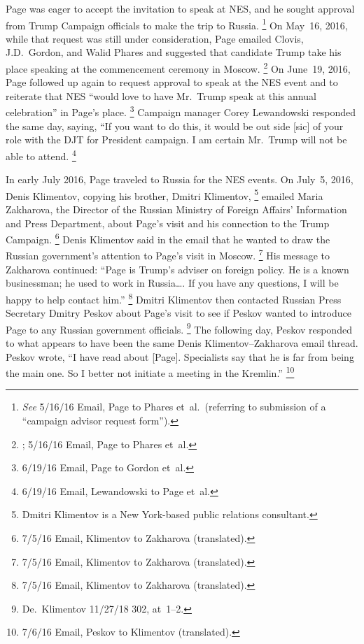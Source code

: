 Page was eager to accept the invitation to speak at NES, and he sought approval from Trump Campaign officials to make the trip to Russia.%
\footnote{\textit{See} 5/16/16 Email, Page to Phares et~al.\
(referring to submission of a ``campaign advisor request form'').}
On May~16, 2016, while that request was still under consideration, Page emailed Clovis, J.D.~Gordon, and Walid Phares and suggested that candidate Trump take his place speaking at the commencement ceremony in Moscow.%
\footnote{\blackout{Grand Jury}; 5/16/16 Email, Page to Phares et~al.}
On June~19, 2016, Page followed up again to request approval to speak at the NES event and to reiterate that NES ``would love to have Mr.~Trump speak at this annual celebration'' in Page's place.%
\footnote{6/19/16 Email, Page to Gordon et~al.}
Campaign manager Corey Lewandowski responded the same day, saying, ``If you want to do this, it would be out side [sic] of your role with the DJT for President campaign. I am certain Mr.~Trump will not be able to attend.%
\footnote{6/19/16 Email, Lewandowski to Page et~al.}

In early July 2016, Page traveled to Russia for the NES events.
On July~5, 2016, Denis Klimentov, copying his brother, Dmitri Klimentov,%
\footnote{Dmitri Klimentov is a New York-based public relations consultant.}
emailed Maria Zakharova, the Director of the Russian Ministry of Foreign Affairs' Information and Press Department, about Page's visit and his connection to the Trump Campaign.%
\footnote{7/5/16 Email, Klimentov to Zakharova (translated).}
Denis Klimentov said in the email that he wanted to draw the Russian government's attention to Page's visit in Moscow.%
\footnote{7/5/16 Email, Klimentov to Zakharova (translated).}
His message to Zakharova continued: ``Page is Trump's adviser on foreign policy.
He is a known businessman; he used to work in Russia\dots.
If you have any questions, I will be happy to help contact him.''%
\footnote{7/5/16 Email, Klimentov to Zakharova (translated).}
Dmitri Klimentov then contacted Russian Press Secretary Dmitry Peskov about Page's visit to see if Peskov wanted to introduce Page to any Russian government officials.%
\footnote{De.~Klimentov 11/27/18 302, at~1--2.}
The following day, Peskov responded to what appears to have been the same Denis Klimentov--Zakharova email thread.
Peskov wrote, ``I have read about [Page].
Specialists say that he is far from being the main one.
So I better not initiate a meeting in the Kremlin.''%
\footnote{7/6/16 Email, Peskov to Klimentov (translated).}

